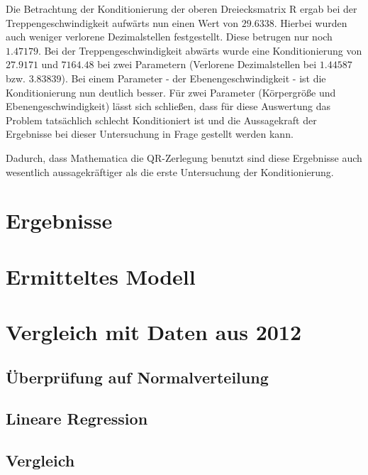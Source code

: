 	Die Betrachtung der Konditionierung der oberen Dreiecksmatrix R ergab bei der Treppengeschwindigkeit aufwärts nun einen Wert von $29.6338$. Hierbei wurden auch weniger verlorene Dezimalstellen festgestellt. Diese betrugen nur noch $1.47179$. Bei der Treppengeschwindigkeit abwärts wurde eine Konditionierung von $27.9171$ und $7164.48$ bei zwei Parametern (Verlorene Dezimalstellen bei $1.44587$ bzw. $3.83839$). Bei einem Parameter - der Ebenengeschwindigkeit - ist die Konditionierung nun deutlich besser. Für zwei Parameter (Körpergröße und Ebenengeschwindigkeit) lässt sich schließen, dass für diese Auswertung das Problem tatsächlich schlecht Konditioniert ist und die Aussagekraft der Ergebnisse bei dieser Untersuchung in Frage gestellt werden kann.
	
	Dadurch, dass Mathematica die QR-Zerlegung benutzt sind diese Ergebnisse auch wesentlich aussagekräftiger als die erste Untersuchung der Konditionierung.
	
	
	
	\section{Ergebnisse}
	\section{Ermitteltes Modell}
	
	\section{Vergleich mit Daten aus 2012}
	\subsection{Überprüfung auf Normalverteilung}
	\subsection{Lineare Regression}
	\subsection{Vergleich}
	
